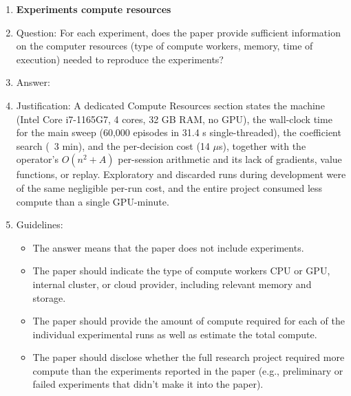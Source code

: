 \begin{enumerate}
\item {\bf Experiments compute resources}
    \item[] Question: For each experiment, does the paper provide sufficient information on the computer resources (type of compute workers, memory, time of execution) needed to reproduce the experiments?
    \item[] Answer: \answerYes{}
    \item[] Justification: A dedicated Compute Resources section states the machine (Intel Core i7-1165G7, 4 cores, 32 GB RAM, no GPU), the wall-clock time for the main sweep (60,000 episodes in 31.4 s single-threaded), the coefficient search (~3 min), and the per-decision cost (14 $\mu$s), together with the operator's $O(n^2 + A)$ per-session arithmetic and its lack of gradients, value functions, or replay. Exploratory and discarded runs during development were of the same negligible per-run cost, and the entire project consumed less compute than a single GPU-minute.
    \item[] Guidelines:
    \begin{itemize}
        \item The answer \answerNA{} means that the paper does not include experiments.
        \item The paper should indicate the type of compute workers CPU or GPU, internal cluster, or cloud provider, including relevant memory and storage.
        \item The paper should provide the amount of compute required for each of the individual experimental runs as well as estimate the total compute. 
        \item The paper should disclose whether the full research project required more compute than the experiments reported in the paper (e.g., preliminary or failed experiments that didn't make it into the paper). 
    \end{itemize}
    

\end{enumerate}

